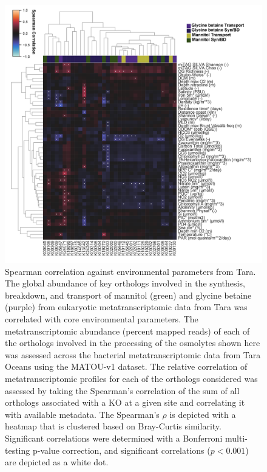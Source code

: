 \documentclass[utf8]{frontiers_suppmat} %
\begin{document}
\begin{figure}[ht]
    \centering
    \includegraphics[width=0.9\columnwidth]{Figures/SI-euk_envfeature_spearman-01.png}
      \caption{Spearman correlation against environmental parameters from Tara. The global abundance of key orthologs involved in the synthesis, breakdown, and transport of mannitol (green) and glycine betaine (purple) from eukaryotic metatranscriptomic data from Tara was correlated with core environmental parameters. The metatranscriptomic abundance (percent mapped reads) of each of the orthologs involved in the processing of the osmolytes shown here was assessed across the bacterial metatranscriptomic data from Tara Oceans using the MATOU-v1 dataset. The relative correlation of metatranscriptomic profiles for each of the orthologs considered was assessed by taking the Spearman's correlation of the sum of all orthologs associated with a KO at a given site and correlating it with available metadata. The Spearman's $\rho$ is depicted with a heatmap that is clustered based on Bray-Curtis similarity. Significant correlations were determined with a Bonferroni multi-testing p-value correction, and significant correlations ($p<0.001$) are depicted as a white dot.}
    \label{fig:euk-spearman}
\end{figure}
\end{document}
